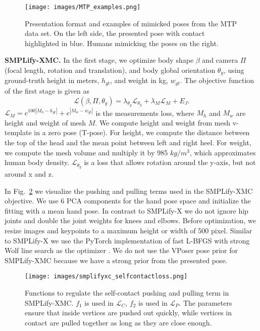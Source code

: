 \documentclass[final]{cvpr}
\newcommand{\smplifyxmc}{\mbox{SMPLify-XMC}\xspace}
\theoremstyle{definition}
\begin{document}
\begin{figure}[t]
	\begin{center}
		\texttt{[image: images/MTP\_examples.png]}
	\end{center}
	\caption{Presentation format and examples of mimicked poses from the MTP data set. On the left side, the presented pose with contact highlighted in blue. Humans mimicking the poses on the right.}
	\label{fig:canyoumimicthepose}
\end{figure}

\textbf{\smplifyxmc.} 
In the first stage, we optimize body shape $\beta$ and camera $\Pi$ (focal length, rotation and translation), and body global orientation $\theta_g$, using ground-truth height in meters, $h_{gt}$, and weight in kg, $w_{gt}$. The objective function of the first stage is given as
$$ \mathcal{L}(\beta, \Pi, \theta_g) = \lambda_{\theta_g} \mathcal{L}_{\theta_g} + \lambda_{M} \mathcal{L}_{M} + E_J. $$
$\mathcal{L}_{M} = e^{100|M_h - h_{gt}|} + e^{|M_w - w_{gt}|}$ is the measurements loss, where $M_h$ and $M_w$ are height and weight of mesh $M$. 
We compute height and weight from mesh v-template in a zero pose (T-pose). 
For height, we compute the distance between the top of the head and the mean point between left and right heel. 
For weight, we compute the mesh volume and multiply it by 985 $kg / m^3$, which approximates human body density.
$\mathcal{L}_{\theta_g}$ is a loss that allows rotation around the y-axis, but not around x and z. 

In Fig.~\ref{fig:tanhfunctions_smplifyxc} we visualize the pushing and pulling terms used in the \smplifyxmc objective. We use 6 PCA components for the hand pose space and initialize the fitting with a mean hand pose. In contrast to SMPLify-X we do not ignore hip joints and double the joint weights for knees and elbows. Before optimization, we resize images and keypoints to a maximum height or width of 500 pixel. Similar to SMPLify-X we use the PyTorch implementation of fast L-BFGS with strong Wolf line search as the optimizer \cite{liu1989limited}. 
We do not use the VPoser pose prior for \smplifyxmc because we have a strong prior from the presented pose.

\begin{figure}
	\begin{center}
		\texttt{[image: images/smplifyxc\_selfcontactloss.png]}
	\end{center}
	\caption{Functions to regulate the self-contact pushing and pulling term in \smplifyxmc. $f_1$ is used in $\mathcal{L}_{C}$, $f_2$ is used in $\mathcal{L}_{P}$. The parameters ensure that inside vertices are pushed out quickly, while vertices in contact are pulled together as long as they are close enough.}
	\label{fig:tanhfunctions_smplifyxc}
\end{figure}
\end{document}
